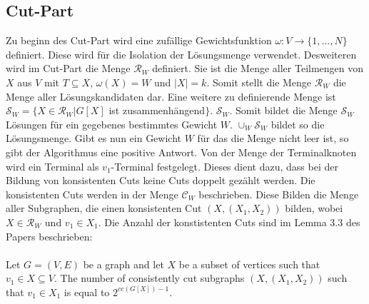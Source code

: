 \subsection{Cut-Part}
Zu beginn des Cut-Part wird eine zufällige Gewichtsfunktion $\omega:V\rightarrow \{1,\dots,N\}$ definiert. Diese wird für die Isolation der Lösungsmenge verwendet.
Desweiteren wird im Cut-Part die Menge $\mathcal{R}_W$ definiert. Sie ist die Menge aller Teilmengen von $X$ aus $V$ mit $T \subseteq X$, $\omega(X)=W$ und $|X|=k$. Somit stellt die Menge $\mathcal{R}_W$ die Menge aller Lösungskandidaten dar.
Eine weitere zu definierende Menge ist $\mathcal{S}_W=\{X \in \mathcal{R}_W | G[X]$ ist zusammenhängend$\}$. $\mathcal{S}_W$. Somit bildet die Menge $\mathcal{S}_W$ Lösungen für ein gegebenes bestimmtes Gewicht $W$.
$\cup_W \mathcal{S}_W$ bildet so die Lösungsmenge. Gibt es nun ein Gewicht $W$ für das die Menge nicht leer ist, so gibt der Algorithmus eine positive Antwort.
Von der Menge der Terminalknoten wird ein Terminal als $v_1$-Terminal festgelegt. Dieses dient dazu, dass bei der Bildung von konsistenten Cuts keine Cuts doppelt gezählt werden.
Die konsistenten Cuts werden in der Menge  $\mathcal{C}_W$ beschrieben. Diese Bilden die Menge aller Subgraphen, die einen konsistenten Cut $(X,(X_1,X_2))$ bilden, wobei $X\in \mathcal{R}_W$ und $v_1 \in X_1$. Die Anzahl der konstistenten Cuts sind im Lemma 3.3 des Papers beschrieben:\\
\\
Let $G=(V,E)$ be a graph and let $X$ be a subset of vertices such that $v_1 \in X \subseteq V$. The number of
consistently cut subgraphs $(X,(X_1,X_2))$ such that $v_1 \in X_1$ is equal to $2^{cc(G[X])-1}$.

